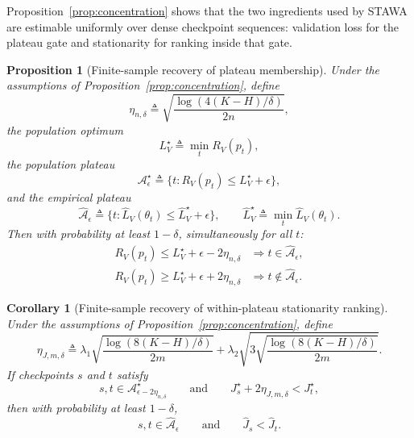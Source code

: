 \documentclass{article}
\newtheorem{proposition}{Proposition}
\newtheorem{corollary}{Corollary}
\newcommand{\stawa}{\textup{\textsc{STAWA}}}
\begin{document}
Proposition~\ref{prop:concentration} shows that the two ingredients used by \stawa{} are estimable uniformly over dense checkpoint sequences: validation loss for the plateau gate and stationarity for ranking inside that gate.

\begin{proposition}[Finite-sample recovery of plateau membership]
\label{prop:plateau_membership}
Under the assumptions of Proposition~\ref{prop:concentration}, define
\begin{equation}
    \eta_{n,\delta}
    \triangleq
    \sqrt{\frac{\log(4(K-H)/\delta)}{2n}},
\end{equation}
the population optimum
\begin{equation}
    L_V^\star \triangleq \min_t R_V(p_t),
\end{equation}
the population plateau
\begin{equation}
    \mathcal{A}_{\epsilon}^\star
    \triangleq
    \{ t : R_V(p_t) \le L_V^\star + \epsilon\},
\end{equation}
and the empirical plateau
\begin{equation}
    \widehat{\mathcal{A}}_{\epsilon}
    \triangleq
    \{ t : \hat L_V(\theta_t) \le \hat L_V^\star + \epsilon\},
    \qquad
    \hat L_V^\star \triangleq \min_t \hat L_V(\theta_t).
\end{equation}
Then with probability at least $1-\delta$, simultaneously for all $t$:
\begin{align}
    R_V(p_t) \le L_V^\star + \epsilon - 2\eta_{n,\delta}
    &\Longrightarrow
    t \in \widehat{\mathcal{A}}_{\epsilon}, \\
    R_V(p_t) \ge L_V^\star + \epsilon + 2\eta_{n,\delta}
    &\Longrightarrow
    t \notin \widehat{\mathcal{A}}_{\epsilon}.
\end{align}
\end{proposition}

\begin{corollary}[Finite-sample recovery of within-plateau stationarity ranking]
\label{cor:ranking}
Under the assumptions of Proposition~\ref{prop:concentration}, define
\begin{equation}
    \eta_{J,m,\delta}
    \triangleq
    \lambda_1 \sqrt{\frac{\log(8(K-H)/\delta)}{2m}}
    +
    \lambda_2 \sqrt{
        3\sqrt{\frac{\log(8(K-H)/\delta)}{2m}}
    }.
\end{equation}
If checkpoints $s$ and $t$ satisfy
\begin{equation}
    s,t \in \mathcal{A}_{\epsilon-2\eta_{n,\delta}}^\star
    \qquad\text{and}\qquad
    J_s^\star + 2\eta_{J,m,\delta} < J_t^\star,
\end{equation}
then with probability at least $1-\delta$,
\begin{equation}
    s,t \in \widehat{\mathcal{A}}_{\epsilon}
    \qquad\text{and}\qquad
    \hat J_s < \hat J_t.
\end{equation}
\end{corollary}
\end{document}
